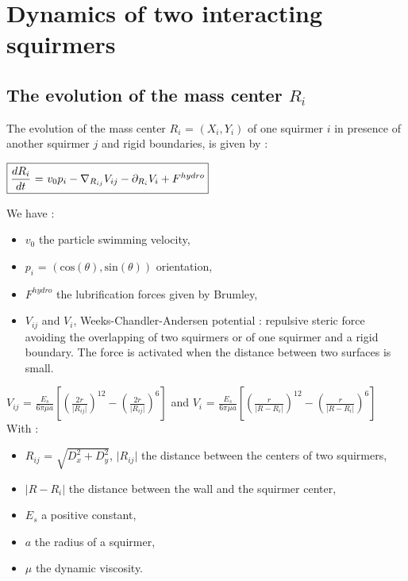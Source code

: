 \documentclass{article}
\begin{document}
\section{Dynamics of two interacting squirmers}
\subsection{The evolution of the mass center $R_i$}
The evolution of the mass center $R_i$ = $(X_i, Y_i)$ of one squirmer $i$ in presence of 
another squirmer $j$ and rigid boundaries, is given by :
\begin{center}
$\boxed{\frac{dR_i}{dt}$ = $v_0 p_i -  \nabla_{R_{ij}} V_{ij} - \partial_{R_i} V_i + F^{hydro}}$
\end{center}
We have : \begin{itemize}
    \item $v_0$ the particle swimming velocity,
    \item $p_i$ = $(\mathrm{cos}(\theta),\mathrm{sin}(\theta))$ orientation,
    \item $F^{hydro}$ the lubrification forces given by Brumley\cite{Brumley},
    \item $V_{ij}$ and $V_i$, Weeks-Chandler-Andersen potential : repulsive steric force avoiding the overlapping of two squirmers or of one squirmer and a rigid boundary. The force is activated when the distance between two surfaces is small.
\end{itemize} 
\vspace{0,5cm}
$V_{ij}$ = $\frac{E_s}{6\pi\mu a}\left[\left(\frac{2r}{\lvert R_{ij}\rvert}\right)^{12} - \left(\frac{2r}{\lvert R_{ij}\rvert}\right)^6\right]$ and  $V_i$ = $\frac{E_s}{6\pi\mu a} \left[ \left( \frac{r}{\lvert R - R_i \rvert} \right)^{12} - \left( \frac{r}{\lvert R - R_i \rvert} \right) ^6 \right]$ 
\vspace{0,3cm}
\\With : \begin{itemize}
    \item $R_{ij}$ = $\sqrt{D_x^2+D_y^2}$, $\lvert R_{ij} \rvert$ the distance between the centers of two squirmers,
    \item $\lvert R - R_i\rvert$ the distance between the wall and the squirmer center,
    \item $E_s$ a positive constant,
    \item $a$ the radius of a squirmer,
    \item $\mu$ the dynamic viscosity.
\end{itemize}
\end{document}
